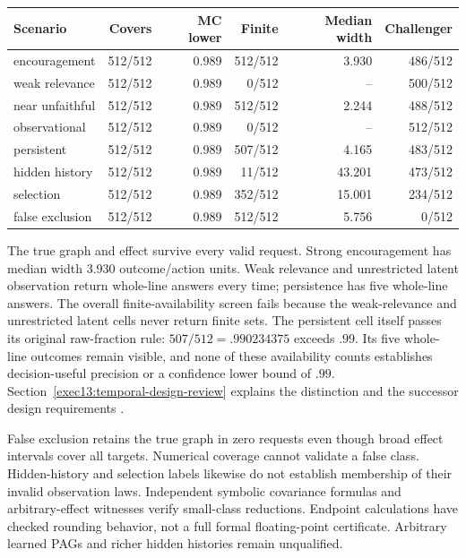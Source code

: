 \begin{center}\footnotesize\begin{tabular}{lrrrrr}\toprule
Scenario & Covers & MC lower & Finite & Median width & Challenger\\
\midrule
encouragement & 512/512 & 0.989 & 512/512 & 3.930 & 486/512 \\
weak relevance & 512/512 & 0.989 & 0/512 & -- & 500/512 \\
near unfaithful & 512/512 & 0.989 & 512/512 & 2.244 & 488/512 \\
observational & 512/512 & 0.989 & 0/512 & -- & 512/512 \\
persistent & 512/512 & 0.989 & 507/512 & 4.165 & 483/512 \\
hidden history & 512/512 & 0.989 & 11/512 & 43.201 & 473/512 \\
selection & 512/512 & 0.989 & 352/512 & 15.001 & 234/512 \\
false exclusion & 512/512 & 0.989 & 512/512 & 5.756 & 0/512 \\
\bottomrule\end{tabular}\end{center}


The true graph and effect survive every valid request. Strong encouragement has median width 3.930 outcome/action units. Weak relevance and unrestricted latent observation return whole-line answers every time; persistence has five whole-line answers. The overall finite-availability screen fails because the weak-relevance and unrestricted latent cells never return finite sets. The persistent cell itself passes its original raw-fraction rule: $507/512=.990234375$ exceeds $.99$. Its five whole-line outcomes remain visible, and none of these availability counts establishes decision-useful precision or a confidence lower bound of $.99$. Section~\ref{exec13:temporal-design-review} explains the distinction and the successor design requirements \cite{exec13_temporal_design}.

False exclusion retains the true graph in zero requests even though broad effect intervals cover all targets. Numerical coverage cannot validate a false class. Hidden-history and selection labels likewise do not establish membership of their invalid observation laws. Independent symbolic covariance formulas and arbitrary-effect witnesses verify small-class reductions. Endpoint calculations have checked rounding behavior, not a full formal floating-point certificate. Arbitrary learned PAGs and richer hidden histories remain unqualified.


